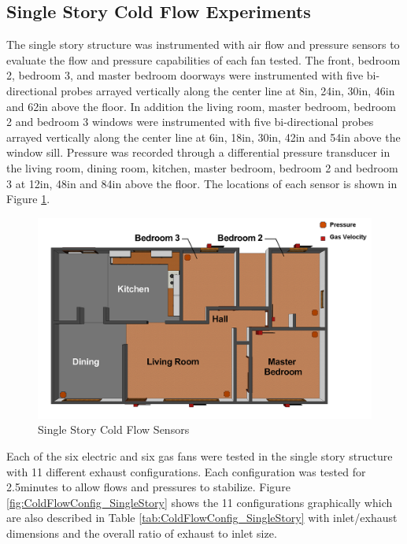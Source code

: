 \documentclass{article}
\begin{document}
\subsection{Single Story Cold Flow Experiments}
The single story structure was instrumented with air flow and pressure sensors to evaluate the flow and pressure capabilities of each fan tested. The front, bedroom 2, bedroom 3, and master bedroom doorways were instrumented with five bi-directional probes arrayed vertically along the center line at 8in, 24in, 30in, 46in and 62in above the floor. In addition the living room, master bedroom, bedroom 2 and bedroom 3 windows were instrumented with five bi-directional probes arrayed vertically along the center line at 6in, 18in, 30in, 42in and 54in above the window sill. Pressure was recorded through a differential pressure transducer in the living room, dining room, kitchen, master bedroom, bedroom 2 and bedroom 3 at 12in, 48in and 84in above the floor. The locations of each sensor is shown in Figure \ref{fig:SingleStoryColdFlowSensors}. 

\begin{figure} [H]
	\centering
	\includegraphics[width = 5in]{0_Images/ColdFlow/SingleStory_Sensors.png}
	\caption{Single Story Cold Flow Sensors}
	\label{fig:SingleStoryColdFlowSensors}
\end{figure}

Each of the six electric and six gas fans were tested in the single story structure with 11 different exhaust configurations. Each configuration was tested for 2.5minutes to allow flows and pressures to stabilize. Figure \ref{fig:ColdFlowConfig_SingleStory} shows the 11 configurations graphically which are also described in Table \ref{tab:ColdFlowConfig_SingleStory} with inlet/exhaust dimensions and the overall ratio of exhaust to inlet size. 
\end{document}

